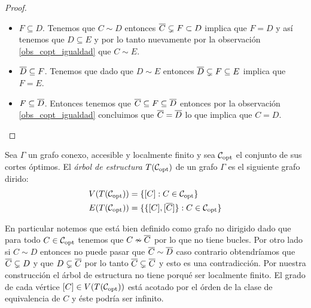 \documentclass[tesis.tex]{subfiles}
\begin{document}
\begin{proof}
\begin{itemize}
\begin{itemize}
			\item $F \subseteq D$.
			Tenemos que $C \sim D$ entonces $\overline C \subsetneq F \subset D$ implica que $F = D$ y así tenemos que $D \subseteq E$ y por lo tanto nuevamente por la observación \ref{obs_copt_igualdad} que $C \sim E$.
			
			\item $\overline D \subseteq F$. 
			Tenemos que dado que $D \sim E$ entonces $\overline D \subsetneq F \subseteq E$ implica que $F = E$.
			
			\item $F \subseteq \overline D$.
			Entonces tenemos que $\overline C \subseteq F \subseteq \overline D$ entonces por la observación \ref{obs_copt_igualdad} concluimos que $\overline C = \overline D$ lo que implica que $C = D$.
		\end{itemize}
	\end{itemize}
\end{proof}

\begin{deff}
	Sea $\Gamma$ un grafo conexo, accesible y localmente finito y sea ${\cal C}_{\text{opt}}$ el conjunto de sus cortes óptimos.
	El \emph{árbol de estructura} $T({\cal C}_{\text{opt}})$ de un grafo $\Gamma$ es el siguiente grafo dirido:
	\begin{align*}
		V(T({\cal C}_{\text{opt}})) &= \{ [C] : C \in {\cal C}_{\text{opt}} \} \\
		E(T({\cal C}_{\text{opt}})) &= \{ \{ [C], [\overline C] \} : C \in {\cal C}_{\text{opt}}   \}
	\end{align*}
\end{deff}

En particular notemos que está bien definido como grafo no dirigido dado que para todo $C \in {\cal C}_{\text{opt}}$ tenemos que $C \nsim \overline C$ por lo que no tiene bucles.
Por otro lado si $C \sim D$ entonces no puede pasar que $\overline C \sim \overline D$ caso contrario obtendríamos que $\overline C \subsetneq D$ y que $D \subsetneq \overline C$ por lo tanto $\overline C \subsetneq \overline C$ y esto es una contradicción.
Por nuestra construcción el árbol de estructura no tiene porqué ser localmente finito.
El grado de cada vértice $[C] \in V(T({\cal C}_{\text{opt}}))$ está acotado por el órden de la clase de equivalencia de $C$ y éste podría ser infinito.
\end{document}
